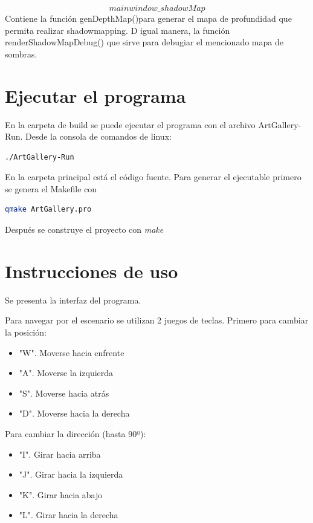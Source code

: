 \documentclass[12pt]{article}
\begin{document}
\textbf{$$mainwindow\_shadowMap$$}
Contiene la función genDepthMap()para generar el mapa de profundidad que permita realizar shadowmapping. D igual manera, la función renderShadowMapDebug() que sirve para debugiar el mencionado mapa de sombras.
{

\section{Ejecutar el programa}
En la carpeta de build se puede ejecutar el programa con el archivo ArtGallery-Run. Desde la consola de comandos de linux:

\begin{lstlisting}[language=bash,title={bash}]
./ArtGallery-Run
\end{lstlisting}


En la carpeta principal está el código fuente. Para generar el ejecutable primero se genera el Makefile con

\begin{lstlisting}[language=bash,title={bash}]
 qmake ArtGallery.pro
\end{lstlisting}

Después se construye el proyecto con \textit{make}

\section{Instrucciones de uso}
Se presenta la interfaz del programa.


Para navegar por el escenario se utilizan 2 juegos de teclas.
Primero para cambiar la posición:
\begin{itemize}
\item "W". Moverse hacia enfrente
\item "A". Moverse la izquierda
\item "S". Moverse hacia atrás
\item "D". Moverse hacia la derecha
\end{itemize}

Para cambiar la dirección (hasta 90º):

\begin{itemize}
\item "I". Girar hacia arriba
\item "J". Girar hacia la izquierda
\item "K". Girar hacia abajo
\item "L". Girar hacia la derecha
\end{itemize}

}
\end{document}
